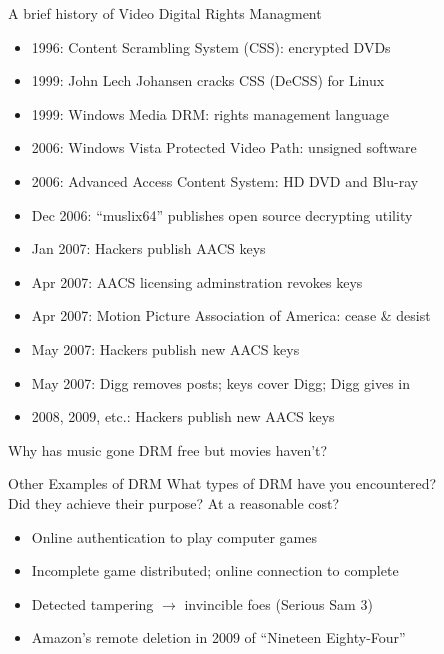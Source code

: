 \documentclass{beamer}
\begin{document}
\begin{frame}{A brief history of Video Digital Rights Managment}
\begin{itemize}
\item 1996: Content Scrambling System (CSS): encrypted DVDs
\item 1999: John Lech Johansen cracks CSS (DeCSS) for Linux
\item 1999: Windows Media DRM: rights management language
\item 2006: Windows Vista Protected Video Path: unsigned software
\item 2006: Advanced Access Content System: HD DVD and Blu-ray
\item Dec 2006: ``muslix64'' publishes open source decrypting utility
\item Jan 2007: Hackers publish AACS keys
\item Apr 2007: AACS licensing adminstration revokes keys
\item Apr 2007: Motion Picture Association of America: cease \& desist
\item May 2007: Hackers publish new AACS keys 
\item May 2007: Digg removes posts; keys cover Digg; Digg gives in
\item 2008, 2009, etc.: Hackers publish new AACS keys
\end{itemize}
\pause
\begin{center}
Why has music gone DRM free but movies haven't?
\end{center}
\end{frame}

\begin{frame}{Other Examples of DRM}
What types of DRM have you encountered? \\
\bigskip
Did they achieve their purpose? At a reasonable cost?\\
\bigskip
\pause
\begin{itemize}
\item Online authentication to play computer games
\item Incomplete game distributed; online connection to complete
\item Detected tampering $\rightarrow$ invincible foes (Serious Sam 3)
\item Amazon's remote deletion in 2009 of ``Nineteen Eighty-Four''
\end{itemize}
\end{frame}
\end{document}
